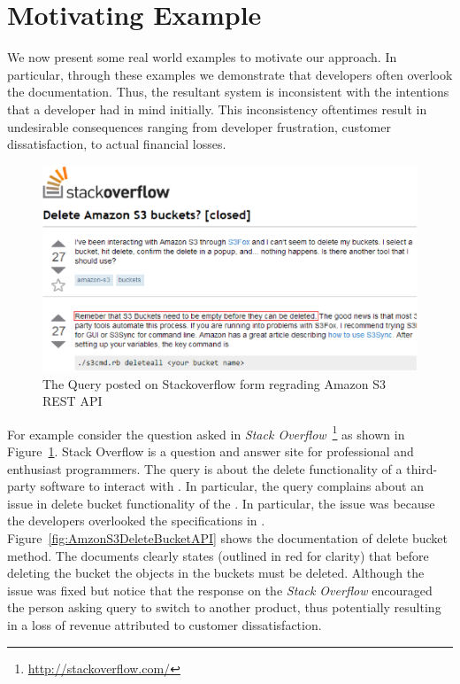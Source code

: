 \section{Motivating Example}
\label{sec:example}

We now present some real world examples to motivate our approach. In particular, through these examples we demonstrate that developers often overlook the documentation. Thus, the resultant system is inconsistent with the intentions that a developer had in mind initially. This inconsistency oftentimes result in undesirable consequences ranging from developer frustration, customer dissatisfaction, to actual financial losses.

\begin{figure}[t]
\begin{center}
\includegraphics[scale=0.4]{Stackoverflow.eps}
\end{center}
\caption{\label{fig:Stackoverflow} The Query posted on Stackoverflow form regrading Amazon S3 REST API}
\end{figure}

For example consider the question asked in \textit{Stack Overflow}~\footnote{\url{http://stackoverflow.com/}} as shown in Figure~\ref{fig:Stackoverflow}. Stack Overflow is a question and answer site for professional and enthusiast programmers. The query is about the delete functionality of a third-party software  to interact with \amazonAPI. In particular, the query complains about an issue in delete bucket functionality of the . In particular, the issue was because the  developers overlooked the specifications in \amazon. Figure~\ref{fig:AmzonS3DeleteBucketAPI} shows the documentation of delete bucket method. The documents clearly states (outlined in red for clarity) that before deleting the bucket the objects in the buckets must be deleted. Although the issue was fixed but notice that the response on the \textit{Stack Overflow} encouraged the person asking query to switch to another product, thus potentially resulting in a loss of revenue attributed to customer dissatisfaction.  


